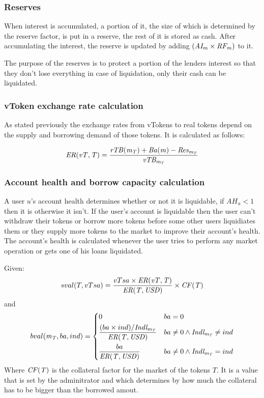 \subsubsection{Reserves}

When interest is accumulated, a portion of it, the size of which is determined by the reserve factor, is put in a reserve, the rest of it is stored as cash. After accumulating the interest, the reserve is updated by adding $(\mathit{AI_{m}} \times \mathit{RF_{m}})$ to it.

The purpose of the reserves is to protect a portion of the lenders interest so that they don't lose everything in case of liquidation, only their cash can be liquidated. 

\subsubsection{vToken exchange rate calculation}

As stated previously the exchange rates from vTokens to real tokens depend on the supply and borrowing demand of those tokens. It is calculated as follows:

$$
\mathit{ER(vT, T)} = \frac{\mathit{rTB(\mathit{m_{T}})} + \mathit{Ba(m)} - \mathit{Res_{\mathit{m_{T}}}}}{\mathit{vTB_{\mathit{m_{T}}}}}
$$

\subsubsection{Account health and borrow capacity calculation}

A user $u$'s account health determines whether or not it is liquidable, if $AH_u < 1$ then it is otherwise it isn't. If the user's account is liquidable then the user can't withdraw their tokens or borrow more tokens before some other users liquidiates them or they supply more tokens to the market to improve their account's health. The account's health is calculated whenever the user tries to perform any market operation or gets one of his loans liquidated.

\noindent Given: 
$$
  sval(T, vTsa) = \frac{vTsa \times \mathit{ER(vT, T)}}{\mathit{ER(T, \mathit{USD})}} \times \mathit{CF(T)}
$$
and
$$
  bval(\mathit{m_{T}}, ba, ind) =\begin{dcases}
    0 & ba = 0\\
    \frac{(ba \times ind)/ \mathit{Indl_{\mathit{m_{T}}}}}{\mathit{ER(T, \mathit{USD})}} & ba \neq 0 \wedge \mathit{Indl_{\mathit{m_{T}}}} \neq ind \\
    \frac{ba}{\mathit{ER(T, \mathit{USD})}} & ba \neq 0 \wedge \mathit{Indl_{\mathit{m_{T}}}} = ind
    \end{dcases}
$$
Where $\mathit{CF(T)}$ is the collateral factor for the market of the tokens $T$. It is a value that is set by the adminitrator and which determines by how much the collateral has to be bigger than the borrowed amout.

